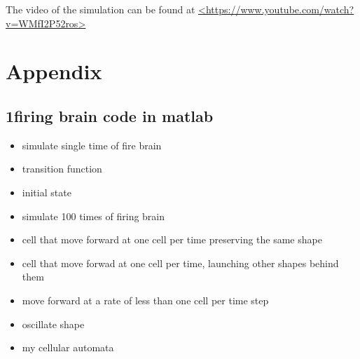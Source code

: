 \documentclass[12pt]{article}
\begin{document}
{The video of the simulation can be found at 
\url{<https://www.youtube.com/watch?v=WMfI2P52ros>}

\newpage
\section{Appendix}

\subsection{1firing brain code in matlab}
\singlespacing
\begin{itemize}
\item {\large simulate single time of fire brain}

\vspace{1cm}

\item {\large transition function}

\vspace{1cm}

\item {\large initial state}

\vspace{1cm}

\item {\large simulate 100 times of firing brain}

\vspace{1cm}

\item {\large cell that move forward at one cell per time preserving the same shape}

\vspace{1cm}

\item {\large cell that move forwad at one cell per time, launching other shapes behind them}

\vspace{1cm}

\item {\large move forward at a rate of less than one cell per time step}

\vspace{1cm}

\item {\large oscillate shape}

\vspace{1cm}


\item {\large my cellular automata}

\vspace{1cm}


\end{itemize}}
\end{document}
